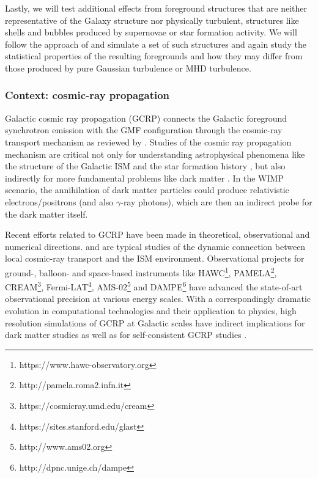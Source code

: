 Lastly, we will test additional effects from foreground structures that are neither representative of the Galaxy structure nor physically turbulent, structures like shells and bubbles produced by supernovae or star formation activity.  We will follow the approach of \cite{Mertsch:2013gg} and simulate a set of such structures and again study the statistical properties of the resulting foregrounds and how they may differ from those produced by pure Gaussian turbulence or MHD turbulence.  


\subsubsection*{Context: cosmic-ray propagation}

Galactic cosmic ray propagation (GCRP) connects the Galactic foreground synchrotron emission with the GMF configuration through the cosmic-ray  transport mechanism as reviewed by \cite{Strong2007}. 
Studies of the cosmic ray propagation mechanism are critical not only for understanding astrophysical phenomena like the structure of the Galactic ISM  \citep{Li2013,Pfrommer2017} and the star formation history \citep{Li2017},  but also indirectly for more fundamental problems like dark matter \citep{Colafrancesco2006a,Gaggero2018}.
In the WIMP scenario, the annihilation of dark matter particles could produce relativistic electrons/positrons (and also $\gamma$-ray photons), which are then an indirect probe for the dark matter itself.

Recent efforts related to GCRP have been made in theoretical, observational and numerical directions.
\cite{Seta2018} and \cite{Shukurov2017} are typical studies of the dynamic connection between local cosmic-ray transport and the ISM environment.
Observational projects for ground-, balloon- and space-based instruments like HAWC\footnote{https://www.hawc-observatory.org}, PAMELA\footnote{http://pamela.roma2.infn.it}, CREAM\footnote{https://cosmicray.umd.edu/cream}, Fermi-LAT\footnote{https://sites.stanford.edu/glast}, AMS-02\footnote{http://www.ams02.org} and DAMPE\footnote{http://dpnc.unige.ch/dampe} have advanced the state-of-art observational precision at various energy scales.
With a correspondingly dramatic evolution in computational technologies and their application to physics, high resolution simulations of GCRP \citep{Orlando2017,Evoli2016,Kissmann2014} at Galactic scales have indirect implications for dark matter studies \citep{Cui2017,Cuoco2017} as well as for  self-consistent GCRP studies \citep{Blasi2012,Evoli2018}.

